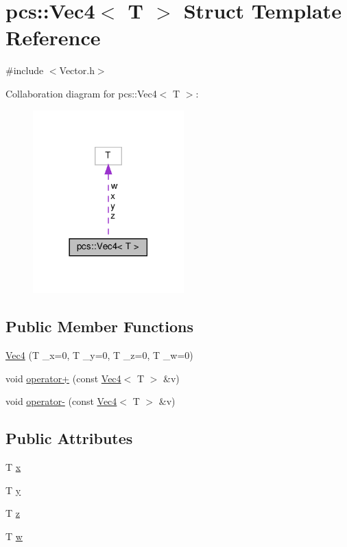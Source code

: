 \hypertarget{structpcs_1_1Vec4}{}\section{pcs\+:\+:Vec4$<$ T $>$ Struct Template Reference}
\label{structpcs_1_1Vec4}


{\ttfamily \#include $<$Vector.\+h$>$}



Collaboration diagram for pcs\+:\+:Vec4$<$ T $>$\+:\nopagebreak
\begin{figure}[H]
\begin{center}
\leavevmode
\includegraphics[width=165pt]{structpcs_1_1Vec4__coll__graph}
\end{center}
\end{figure}
\subsection*{Public Member Functions}
\begin{DoxyCompactItemize}
\item 
\hyperlink{structpcs_1_1Vec4_a27f1a1105518c6ebcaa93142da7261f2}{Vec4} (T \+\_\+x=0, T \+\_\+y=0, T \+\_\+z=0, T \+\_\+w=0)
\item 
void \hyperlink{structpcs_1_1Vec4_aa95db0b3357930d644043d68eabafc14}{operator+} (const \hyperlink{structpcs_1_1Vec4}{Vec4}$<$ T $>$ \&v)
\item 
void \hyperlink{structpcs_1_1Vec4_af8f79222d143d3ad0721bc0c1d54ee61}{operator-\/} (const \hyperlink{structpcs_1_1Vec4}{Vec4}$<$ T $>$ \&v)
\end{DoxyCompactItemize}
\subsection*{Public Attributes}
\begin{DoxyCompactItemize}
\item 
T \hyperlink{structpcs_1_1Vec4_a0fd8f6c242a034fbb3c37c3c850726b1}{x}
\item 
T \hyperlink{structpcs_1_1Vec4_af4af93f37c3bcef1fa49608ec2619c5d}{y}
\item 
T \hyperlink{structpcs_1_1Vec4_acc074b9bebdebd5e8f1ee2680d155a3c}{z}
\item 
T \hyperlink{structpcs_1_1Vec4_acd61cfe0a788dd8ac02b6415600eb122}{w}
\end{DoxyCompactItemize}


